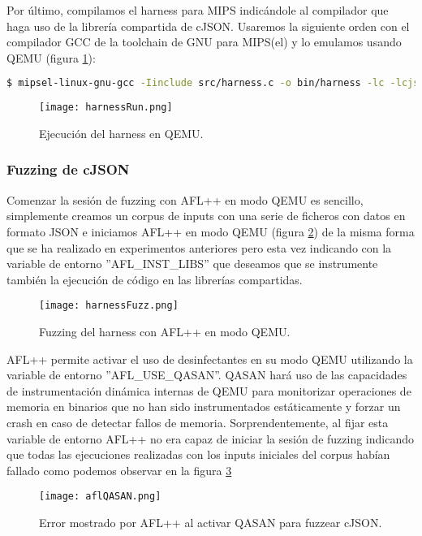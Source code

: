 Por último, compilamos el harness para MIPS indicándole al compilador que haga uso de la librería compartida de cJSON. Usaremos la 
siguiente orden con el compilador GCC de la toolchain de GNU para MIPS(el) y lo emulamos usando QEMU (figura \ref{fig:harnessRun}):

\begin{lstlisting}[language=bash]
    $ mipsel-linux-gnu-gcc -Iinclude src/harness.c -o bin/harness -lc -lcjson
\end{lstlisting}

\begin{figure}[H]
    \centering
    \texttt{[image: harnessRun.png]}
    \caption{Ejecución del harness en QEMU.}
    \label{fig:harnessRun}
\end{figure}

\subsubsection{Fuzzing de cJSON}
Comenzar la sesión de fuzzing con AFL++ en modo QEMU es sencillo, simplemente creamos un corpus de inputs 
con una serie de ficheros con datos en formato JSON e iniciamos AFL++ en modo QEMU (figura \ref{fig:harnessFuzz})
de la misma forma que se ha realizado en experimentos anteriores pero esta vez indicando con la variable de entorno
''AFL\_INST\_LIBS'' que deseamos que se instrumente también la ejecución de código en las librerías compartidas.

\begin{figure}[H]
    \centering
    \texttt{[image: harnessFuzz.png]}
    \caption{Fuzzing del harness con AFL++ en modo QEMU.}
    \label{fig:harnessFuzz}
\end{figure}

AFL++ permite activar el uso de desinfectantes en su modo QEMU utilizando la variable de entorno ''AFL\_USE\_QASAN''.
QASAN hará uso de las capacidades de instrumentación dinámica internas de QEMU para monitorizar operaciones de memoria 
en binarios que no han sido instrumentados estáticamente y forzar un crash en caso de detectar fallos de memoria. 
Sorprendentemente, al fijar esta variable de entorno AFL++ no era capaz de iniciar la sesión de fuzzing indicando que 
todas las ejecuciones realizadas con los inputs iniciales del corpus habían fallado como podemos 
observar en la figura \ref{fig:aflQASAN}

\begin{figure}[H]
    \centering
    \texttt{[image: aflQASAN.png]}
    \caption{Error mostrado por AFL++ al activar QASAN para fuzzear cJSON.}
    \label{fig:aflQASAN}
\end{figure}

